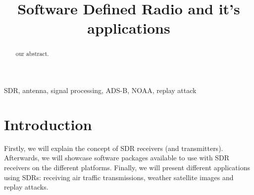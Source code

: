 \documentclass[conference]{IEEEtran}
\begin{document}
\title{Software Defined Radio and it's applications
}

\author{
	\and
}

\maketitle

\begin{abstract}
our abstract.\cite{Heuberger2017}
\end{abstract}

\begin{IEEEkeywords}
SDR, antenna, signal processing, ADS-B, NOAA, replay attack 
\end{IEEEkeywords}

\section{Introduction} %

Firstly, we will explain the concept of SDR receivers (and transmitters). Afterwards, we will showcase software packages available to use with SDR receivers on the different platforms. Finally, we will present different applications using SDRs: receiving air traffic transmissions, weather satellite images and replay attacks.
\end{document}
